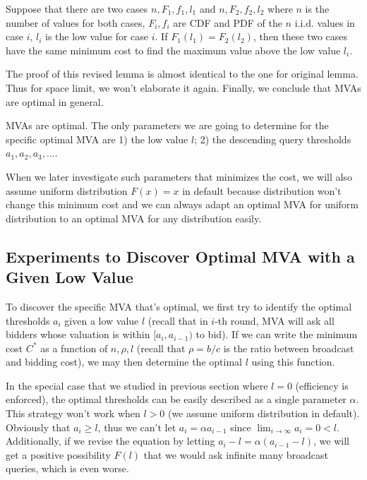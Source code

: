 \begin{lemma}\label{lemma:lowest_type}
Suppose that there are two cases $n, F_1, f_1, l_1$ and $n, F_2, f_2, l_2$
where $n$ is the number of values for both cases, $F_i, f_i$ are CDF and PDF
of the $n$ i.i.d. values in case $i$, $l_i$ is the low value for case $i$.
If $F_1(l_1) = F_2(l_2)$, then these two cases have the same minimum cost
to find the maximum value above the low value $l_i$.
\end{lemma}

The proof of this revised lemma is almost identical to the one for original
lemma. Thus for space limit, we won't elaborate it again. Finally, we conclude
that MVAs are optimal in general.

\begin{corollary}

MVAs are optimal. The only parameters we are going to determine for the
specific optimal MVA are 1) the low value $l$; 2) the descending query
thresholds $a_1, a_2, a_3, \ldots$.

\end{corollary}

When we later investigate such parameters that minimizes the cost, we will
also assume uniform distribution $F(x) = x$ in default because distribution won't
change this minimum cost and we can always adapt an optimal MVA for uniform distribution
to an optimal MVA for any distribution easily.

\subsection{Experiments to Discover Optimal MVA with a Given Low Value}

To discover the specific MVA that's optimal, we first try to identify the
optimal thresholds $a_i$ given a low value $l$  (recall that in $i$-th round,
MVA will ask all bidders whose valuation is within $[a_i, a_{i-1})$ to bid).
If we can write the minimum cost $C^*$ as a function of $n, \rho, l$ (recall
that $\rho = b/c$ is the ratio between broadcast and bidding cost), we may then
determine the optimal $l$ using this function.

In the special case that we studied in previous section where $l = 0$
(efficiency is enforced), the optimal thresholds can be easily described as a
single parameter $\alpha$. This strategy won't work when $l > 0$ (we assume uniform
distribution in default). Obviously that $a_i \geq l$,
thus we can't let $a_i = \alpha a_{i-1}$ since $\lim_{i \rightarrow \infty} a_i
= 0 < l$.  Additionally, if we revise the equation by letting $a_i-l = \alpha
(a_{i-1}-l)$, we will get a positive possibility $F(l)$ that we would ask
infinite many broadcast queries, which is even worse.

